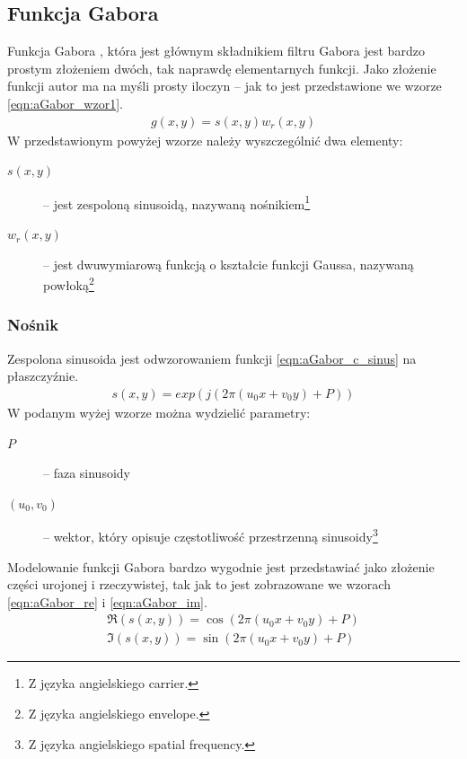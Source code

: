 \subsection{Funkcja Gabora}
\label{aGabor_funkcja}

Funkcja Gabora \cite{Movellan}, która jest głównym składnikiem filtru Gabora jest bardzo prostym złożeniem dwóch, tak naprawdę elementarnych funkcji. Jako złożenie funkcji autor ma na myśli prosty iloczyn -- jak to jest przedstawione we wzorze \ref{eqn:aGabor_wzor1}.
\begin{align}\label{eqn:aGabor_wzor1}
g(x, y) = s(x, y) w_r (x, y)
\end{align}
W przedstawionym powyżej wzorze należy wyszczególnić dwa elementy: 
\begin{description}
\item [$s(x, y)$] -- jest zespoloną sinusoidą, nazywaną nośnikiem\footnote{Z języka angielskiego carrier.}
\item [$w_r (x, y)$] -- jest dwuwymiarową funkcją o kształcie funkcji Gaussa, nazywaną powłoką\footnote{Z języka angielskiego envelope.}
\end{description}

\subsubsection{Nośnik}
\label{aGabor_carrier}

Zespolona sinusoida jest odwzorowaniem funkcji \ref{eqn:aGabor_c_sinus} na płaszczyźnie.
\begin{align}\label{eqn:aGabor_c_sinus}
s(x, y) = exp(j(2\pi(u_0x + v_0y)+P))
\end{align}
W podanym wyżej wzorze można wydzielić parametry:
\begin{description}
\item [$P$] -- faza sinusoidy
\item [$(u_0, v_0)$] -- wektor, który opisuje częstotliwość przestrzenną sinusoidy\footnote{Z języka angielskiego spatial frequency.}
\end{description}

Modelowanie funkcji Gabora bardzo wygodnie jest przedstawiać jako złożenie części urojonej i rzeczywistej, tak jak to jest zobrazowane we wzorach \ref{eqn:aGabor_re} i \ref{eqn:aGabor_im}.
\begin{align}\label{eqn:aGabor_re}
\Re(s(x, y)) = \cos(2\pi(u_0x + v_0y)+P)\\
\label{eqn:aGabor_im}
\Im(s(x, y)) = \sin(2\pi(u_0x + v_0y)+P)
\end{align}


